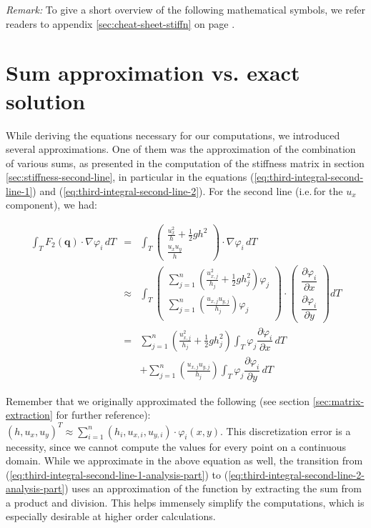 \documentclass[a4paper, twoside]{article}
\newcommand{\pd}[2]{\dfrac{\partial #1}{\partial #2}}
\renewcommand{\phi}{\varphi}
\begin{document}
\emph{Remark:} To give a short overview of the following mathematical symbols, we refer readers to appendix \ref{sec:cheat-sheet-stiffn} on page \pageref{sec:cheat-sheet-stiffn}.

\section{Sum approximation vs. exact solution}
\label{sec:point-wise-appr-vs-exact-solution-intro}

While deriving the equations necessary for our computations, we introduced several approximations. One of them was the approximation of the combination of various sums, as presented in the computation of the stiffness matrix in section \ref{sec:stiffness-second-line}, in particular in the equations (\ref{eq:third-integral-second-line-1}) and (\ref{eq:third-integral-second-line-2}). For the second line (i.e.\,for the $u_x$ component), we had:

\begin{eqnarray}
  \label{eq:third-integral-second-line-1-analysis-part}
  \int_T F_2(\mathbf{q}) \cdot \nabla \phi_i \, dT & = &
  \int_T
  \begin{pmatrix}
    \frac{u_x^2}{h} + \frac{1}{2} g h^2 \\ \frac{u_x u_y}{h}
  \end{pmatrix}
  \cdot \nabla \phi_i \, dT \\
  \label{eq:third-integral-second-line-2-analysis-part}
  & \approx &
  \int_T
  \begin{pmatrix}
    \sum_{j=1}^n \left(\frac{u_{x,j}^2}{h_j} + \frac{1}{2} g h_j^2\right) \phi_j \\
    \sum_{j=1}^n \left(\frac{u_{x,j} u_{y,j}}{h_j}\right) \phi_j \\
  \end{pmatrix}
  \cdot
  \begin{pmatrix}
    \pd{\phi_i}{x} \\
    \pd{\phi_i}{y}
  \end{pmatrix} dT \\
  & = & \nonumber \sum_{j=1}^n \left(\frac{u_{x,j}^2}{h_j} + \frac{1}{2} g h_j^2\right) \int_T \phi_j \pd{\phi_i}{x} \, dT \\
  & {} & + \nonumber \sum_{j=1}^n \left(\frac{u_{x,j} u_{y,j}}{h_j}\right) \int_T \phi_j \pd{\phi_i}{y} \, dT
\end{eqnarray}

Remember that we originally approximated the following (see section \ref{sec:matrix-extraction} for further reference):  $(h, u_x, u_y)^T \approx \sum_{i=1}^n (h_i, u_{x,i}, u_{y,i}) \cdot \phi_i(x,y)$. This discretization error is a necessity, since we cannot compute the values for every point on a continuous domain. While we approximate in the above equation as well, the transition from (\ref{eq:third-integral-second-line-1-analysis-part}) to (\ref{eq:third-integral-second-line-2-analysis-part}) uses an approximation of the function by extracting the sum from a product and division. This helps immensely simplify the computations, which is especially desirable at higher order calculations.
\end{document}
